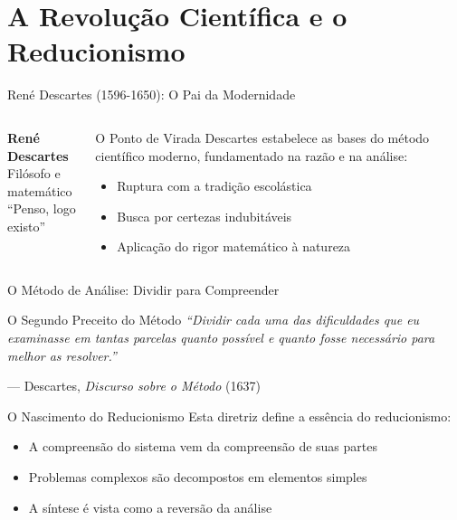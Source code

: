 \section{A Revolução Científica e o Reducionismo}

\begin{frame}[shrink=5]{René Descartes (1596-1650): O Pai da Modernidade}
\begin{columns}
\begin{center}
\textbf{René Descartes}\\
\vspace{0.2cm}
{\small Filósofo e matemático}\\
{\small ``Penso, logo existo''}
\end{center}

\begin{block}{O Ponto de Virada}
Descartes estabelece as bases do método científico moderno, fundamentado na razão e na análise:
\begin{itemize}
    \item Ruptura com a tradição escolástica
    \item Busca por certezas indubitáveis
    \item Aplicação do rigor matemático à natureza
\end{itemize}
\end{block}
\end{columns}
\end{frame}

\begin{frame}{O Método de Análise: Dividir para Compreender}
\begin{exampleblock}{O Segundo Preceito do Método}
\textit{``Dividir cada uma das dificuldades que eu examinasse em tantas parcelas quanto possível e quanto fosse necessário para melhor as resolver.''}
\begin{flushright}
--- Descartes, \textit{Discurso sobre o Método} (1637)
\end{flushright}
\end{exampleblock}

\vspace{0.3cm}

\begin{block}{O Nascimento do Reducionismo}
Esta diretriz define a essência do reducionismo:
\begin{itemize}
    \item A compreensão do sistema vem da compreensão de suas partes
    \item Problemas complexos são decompostos em elementos simples
    \item A síntese é vista como a reversão da análise
\end{itemize}
\end{block}
\end{frame}

